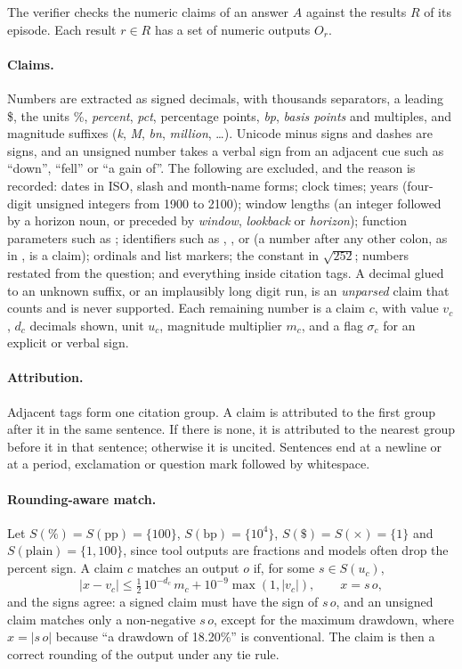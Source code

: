 The verifier checks the numeric claims of an answer $A$ against the results
$R$ of its episode. Each result $r \in R$ has a set of numeric outputs $O_r$.

\paragraph{Claims.} Numbers are extracted as signed decimals, with thousands
separators, a leading \$, the units \%, \emph{percent}, \emph{pct},
percentage points, \emph{bp}, \emph{basis points} and multiples, and magnitude
suffixes (\emph{k}, \emph{M}, \emph{bn}, \emph{million}, \ldots). Unicode minus
signs and dashes are signs, and an unsigned number takes a verbal sign from an
adjacent cue such as ``down'', ``fell'' or ``a gain of''. The following are
excluded, and the reason is recorded: dates in ISO, slash and month-name
forms; clock times; years (four-digit unsigned integers from 1900 to 2100);
window lengths (an integer followed by a horizon noun, or preceded by
\emph{window}, \emph{lookback} or \emph{horizon}); function parameters such as
; identifiers such as , ,  or
 (a number after any other colon, as in , is a
claim);
ordinals and list markers; the constant in $\sqrt{252}$; numbers restated from
the question; and everything inside citation tags. A decimal glued to an
unknown suffix, or an implausibly long digit run, is an \emph{unparsed} claim
that counts and is never supported. Each remaining number is a claim $c$, with
value $v_c$, $d_c$ decimals shown, unit $u_c$, magnitude multiplier $m_c$, and
a flag $\sigma_c$ for an explicit or verbal sign.

\paragraph{Attribution.} Adjacent \code{[r:\dots]} tags form one citation
group. A claim is attributed to the first group after it in the same sentence.
If there is none, it is attributed to the nearest group before it in that
sentence; otherwise it is uncited. Sentences end at a newline or at a period,
exclamation or question mark followed by whitespace.

\paragraph{Rounding-aware match.} Let $S(\%) = S(\mathrm{pp}) = \{100\}$,
$S(\mathrm{bp}) = \{10^4\}$, $S(\$) = S(\times) = \{1\}$ and
$S(\text{plain}) = \{1, 100\}$, since tool outputs are fractions and models
often drop the percent sign. A claim $c$ matches an output $o$ if, for some
$s \in S(u_c)$,
\begin{equation}
  |x - v_c| \le \tfrac{1}{2}\,10^{-d_c}\,m_c + 10^{-9}\max(1, |v_c|),
  \qquad x = s\,o,
  \label{eq:match}
\end{equation}
and the signs agree: a signed claim must have the sign of $s\,o$, and an
unsigned claim matches only a non-negative $s\,o$, except for the maximum
drawdown, where $x = |s\,o|$ because ``a drawdown of 18.20\%'' is
conventional. The claim is then a correct rounding of the output under any tie
rule.

